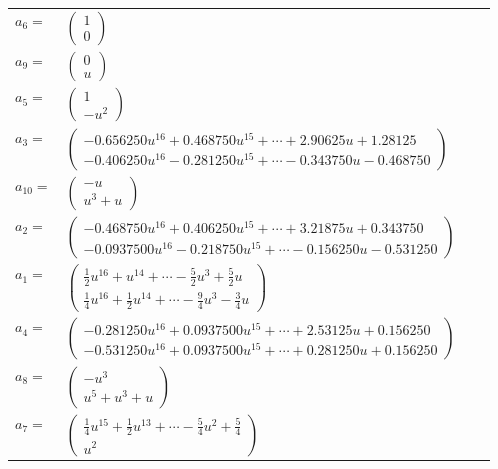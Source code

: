 \documentclass[1p]{elsarticle_modified}
\theoremstyle{definition}
\begin{document}
\begin{tabular}{m{7pt} m{180pt} m{7pt} m{180pt} }
\flushright $a_{6}=$&$\begin{pmatrix}1\\0\end{pmatrix}$ \\
\flushright $a_{9}=$&$\begin{pmatrix}0\\u\end{pmatrix}$ \\
\flushright $a_{5}=$&$\begin{pmatrix}1\\- u^2\end{pmatrix}$ \\
\flushright $a_{3}=$&$\begin{pmatrix}-0.656250 u^{16}+0.468750 u^{15}+\cdots+2.90625 u+1.28125\\-0.406250 u^{16}-0.281250 u^{15}+\cdots-0.343750 u-0.468750\end{pmatrix}$ \\
\flushright $a_{10}=$&$\begin{pmatrix}- u\\u^3+u\end{pmatrix}$ \\
\flushright $a_{2}=$&$\begin{pmatrix}-0.468750 u^{16}+0.406250 u^{15}+\cdots+3.21875 u+0.343750\\-0.0937500 u^{16}-0.218750 u^{15}+\cdots-0.156250 u-0.531250\end{pmatrix}$ \\
\flushright $a_{1}=$&$\begin{pmatrix}\frac{1}{2} u^{16}+u^{14}+\cdots-\frac{5}{2} u^3+\frac{5}{2} u\\\frac{1}{4} u^{16}+\frac{1}{2} u^{14}+\cdots-\frac{9}{4} u^3-\frac{3}{4} u\end{pmatrix}$ \\
\flushright $a_{4}=$&$\begin{pmatrix}-0.281250 u^{16}+0.0937500 u^{15}+\cdots+2.53125 u+0.156250\\-0.531250 u^{16}+0.0937500 u^{15}+\cdots+0.281250 u+0.156250\end{pmatrix}$ \\
\flushright $a_{8}=$&$\begin{pmatrix}- u^3\\u^5+u^3+u\end{pmatrix}$ \\
\flushright $a_{7}=$&$\begin{pmatrix}\frac{1}{4} u^{15}+\frac{1}{2} u^{13}+\cdots-\frac{5}{4} u^2+\frac{5}{4}\\u^2\end{pmatrix}$ \\

\end{tabular}
\end{document}
